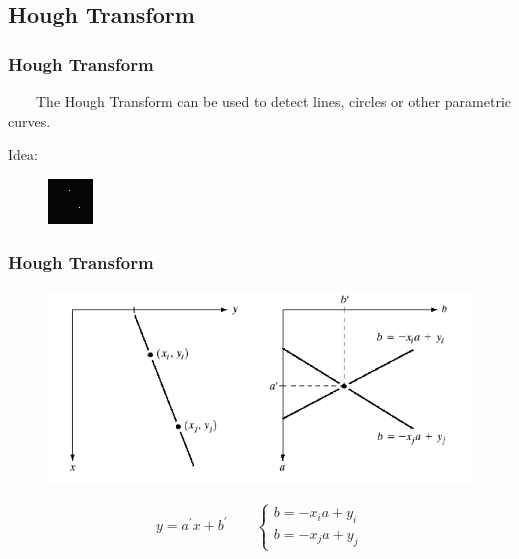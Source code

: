 \documentclass[notheorems,serif,table,compress]{beamer}  %
\begin{document}
\subsection{Hough Transform}

\begin{frame}
\frametitle{Hough Transform}
~~~~The Hough Transform can be used to detect {\color{blue}lines}, {\color{blue}circles} or other parametric curves.\newline

{\color{blue}Idea:}
    \begin{figure}[!ht]
        \includegraphics[width=0.4\linewidth]{hough22.png}
    \end{figure}
\end{frame}

\begin{frame}
\frametitle{Hough Transform}
    \begin{figure}
        \includegraphics[width=0.8\linewidth]{hough.png} 
    \end{figure}
    \begin{displaymath}
        y=a^{'}x+b^{'}
        \qquad
        \left\{ \begin{array}{c}
        b = -x_{i}a+y_{i}\\
        b = -x_{j}a+y_{j}
        \end{array} \right.
    \end{displaymath}
\end{frame}
\end{document}

